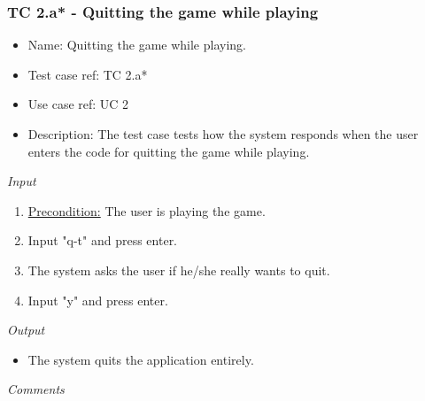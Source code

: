 \documentclass[12pt, letterpaper]{article}
\begin{document}
\subsubsection{TC 2.a* - Quitting the game while playing}
\begin{itemize}
	\item Name: Quitting the game while playing.
	\item Test case ref: TC 2.a*
	\item Use case ref: UC 2
	\item Description: The test case tests how the system responds when the user enters the code for quitting the game while playing.
\end{itemize}
\emph{Input}
\begin{enumerate}
	\item \underline{Precondition:} The user is playing the game.
	\item Input "q-t" and press enter.
	\item The system asks the user if he/she really wants to quit.
	\item Input "y" and press enter.
\end{enumerate}
\emph{Output}
\begin{itemize}
	\item The system quits the application entirely.
\end{itemize}
\begin{Form}
\newline
{}
\newline
\end{Form}
\newline
\emph{Comments}
\newline
\newline
\newline
\newline
\newline
\newline
\newline
\end{document}
